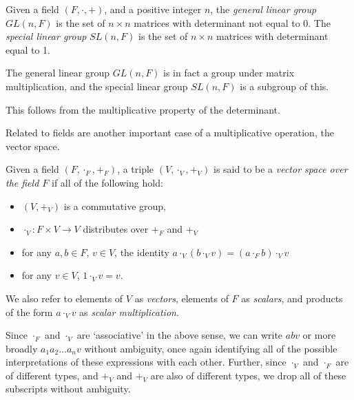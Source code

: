 \begin{define}
	Given a field $(F, \cdot, +)$, and a positive integer $n$, the \emph{general linear group} $GL(n, F)$ is the set of $n \times n$ matrices with determinant not equal to 0. The \emph{special linear group} $SL(n, F)$ is the set of $n \times n$ matrices with determinant equal to 1.
\end{define}

\begin{prop}
	The general linear group $GL(n, F)$ is in fact a group under matrix multiplication, and the special linear group $SL(n, F)$ is a subgroup of this.
\end{prop}
This follows from the multiplicative property of the determinant.

Related to fields are another important case of a multiplicative operation, the vector space.
\begin{define} Given a field $(F, \cdot_F, +_F)$, a triple $(V, \cdot_V, +_V)$ is said to be a \emph{vector space over the field $F$} if all of the following hold:
\begin{itemize}
	\item $(V, +_V)$ is a commutative group,
	\item $\cdot_V: F \times V \to V$ distributes over $+_F$ and $+_V$
	\item for any $a, b \in F$, $v \in V$, the identity $a \cdot_V (b \cdot_V v) = (a \cdot_F b) \cdot_V v$
	\item for any $v \in V$, $1 \cdot_V v = v$.
\end{itemize}
We also refer to elements of $V$ as \emph{vectors}, elements of $F$ as \emph{scalars}, and products of the form $a\cdot_V v$ as \emph{scalar multiplication}.
\end{define}
Since $\cdot_F$ and $\cdot_V$ are `associative' in the above sense, we can write $abv$ or more broadly $a_1a_2\dots a_nv$ without ambiguity, once again identifying all of the possible interpretations of these expressions with each other. Further, since $\cdot_V$ and $\cdot_F$ are of different types, and $+_V$ and $+_V$ are also of different types, we drop all of these subscripts without ambiguity.

